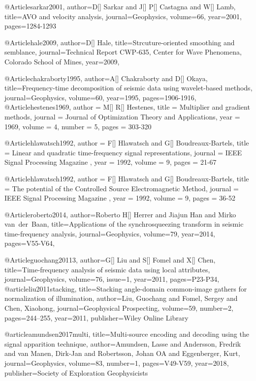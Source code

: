 @Article{sarkar2001,
author={D[] Sarkar and J[] P[] Castagna and W[] Lamb},
title={AVO and velocity analysis},
journal={Geophysics},
volume=66,
year=2001,
pages={1284-1293}
}

@Article{hale2009,
author={D[] Hale},
title={Strcuture-oriented smoothing and semblance},
journal={Technical Report CWP-635, Center for Wave Phenomena, Colorado School of Mines},
year=2009,
}


@Article{chakraborty1995,
author={A[] Chakraborty and D[] Okaya},
title={Frequency-time decomposition of
seismic data using wavelet-based methods},
journal={Geophysics},
volume=60,
year=1995,
pages={1906-1916},
}
@Article{hestenes1969,
  author = 	 {M[] R[] Hestenes},
  title = 	 {Multiplier and gradient methods},
  journal = 	 {Journal of Optimization Theory and Applications},
  year = 	 1969,
  volume = 	 4,
  number = 5,
  pages = 	 {303-320}
}

@Article{hlawatsch1992,
  author = 	 {F[] Hlawatsch and G[] Boudreaux-Bartels},
  title = 	 { Linear and quadratic time-frequency signal representations},
  journal = 	 { IEEE Signal Processing Magazine },
  year = 	 1992,
  volume = 	 9,
  pages = 	 {21-67}
}

@Article{hlawatsch1992,
  author = 	 {F[] Hlawatsch and G[] Boudreaux-Bartels},
  title = 	 {The potential of the Controlled Source Electromagnetic Method},
  journal = 	 { IEEE Signal Processing Magazine },
  year = 	 1992,
  volume = 	 9,
  pages = 	 {36-52}
}

@Article{roberto2014,
author={Roberto H[] Herrer and Jiajun Han and Mirko van~der~Baan},
title={Applications of the synchrosqueezing transform
in seismic time-frequency analysis},
journal={Geophysics},
volume=79,
year=2014,
pages={V55-V64},
}

@Article{guochang20113,
author={G[] Liu and S[] Fomel and X[] Chen},
title={Time-frequency analysis of seismic data using local attributes},
journal={Geophysics},
volume=76,
issue=1,
year=2011,
pages={P23-P34},
}
@article{liu2011stacking,
  title={Stacking angle-domain common-image gathers for normalization of illumination},
  author={Liu, Guochang and Fomel, Sergey and Chen, Xiaohong},
  journal={Geophysical Prospecting},
  volume={59},
  number={2},
  pages={244--255},
  year={2011},
  publisher={Wiley Online Library}
}

@article{amundsen2017multi,
  title={Multi-source encoding and decoding using the signal apparition technique},
  author={Amundsen, Lasse and Andersson, Fredrik and van Manen, Dirk-Jan and Robertsson, Johan OA and Eggenberger, Kurt},
  journal={Geophysics},
  volume={83},
  number={1},
  pages={V49-V59},
  year={2018},
  publisher={Society of Exploration Geophysicists}
}



